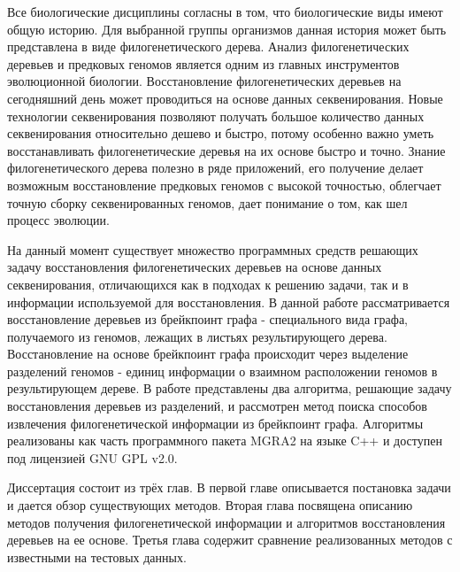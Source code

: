 \intro

Все биологические дисциплины согласны в том, что биологические виды имеют общую историю.
Для выбранной группы организмов данная история может быть представлена в виде филогенетического дерева.
Анализ филогенетических деревьев и предковых геномов является одним из главных инструментов эволюционной биологии.
Восстановление филогенетических деревьев на сегодняшний день может проводиться на основе данных секвенирования.
Новые технологии секвенирования позволяют получать большое количество данных секвенирования относительно дешево и быстро,
потому особенно важно уметь восстанавливать филогенетические деревья на их основе быстро и точно.
Знание филогенетического дерева полезно в ряде приложений, его получение делает возможным восстановление предковых геномов с высокой точностью,
облегчает точную сборку секвенированных геномов, дает понимание о том, как шел процесс эволюции.

На данный момент существует множество программных средств решающих задачу восстановления филогенетических деревьев на основе данных
секвенирования, отличающихся как в подходах к решению задачи, так и в информации используемой для восстановления.
В данной работе рассматривается восстановление деревьев из брейкпоинт графа - специального вида графа, получаемого из геномов,
лежащих в листьях результирующего дерева.
Восстановление на основе брейкпоинт графа происходит через выделение разделений геномов -
единиц информации о взаимном расположении геномов в результирующем дереве.
В работе представлены два алгоритма, решающие задачу восстановления деревьев из разделений,
и рассмотрен метод поиска способов извлечения филогенетической информации из брейкпоинт графа.
Алгоритмы реализованы как часть программного пакета MGRA2 на языке C++ и доступен под лицензией GNU GPL v2.0.

Диссертация состоит из трёх глав.
В первой главе описывается постановка задачи и дается обзор существующих методов.
Вторая глава посвящена описанию методов получения филогенетической информации и алгоритмов восстановления деревьев на ее основе.
Третья глава содержит сравнение реализованных методов с известными на тестовых данных.
